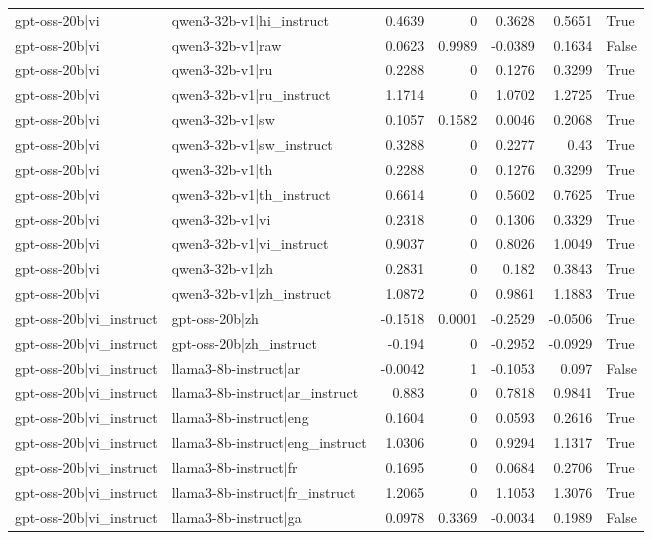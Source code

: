 \begin{table}
\begin{tabular}{l l r r r r l}
gpt-oss-20b|vi & qwen3-32b-v1|hi_instruct & 0.4639 & 0 & 0.3628 & 0.5651 & True \\
gpt-oss-20b|vi & qwen3-32b-v1|raw & 0.0623 & 0.9989 & -0.0389 & 0.1634 & False \\
gpt-oss-20b|vi & qwen3-32b-v1|ru & 0.2288 & 0 & 0.1276 & 0.3299 & True \\
gpt-oss-20b|vi & qwen3-32b-v1|ru_instruct & 1.1714 & 0 & 1.0702 & 1.2725 & True \\
gpt-oss-20b|vi & qwen3-32b-v1|sw & 0.1057 & 0.1582 & 0.0046 & 0.2068 & True \\
gpt-oss-20b|vi & qwen3-32b-v1|sw_instruct & 0.3288 & 0 & 0.2277 & 0.43 & True \\
gpt-oss-20b|vi & qwen3-32b-v1|th & 0.2288 & 0 & 0.1276 & 0.3299 & True \\
gpt-oss-20b|vi & qwen3-32b-v1|th_instruct & 0.6614 & 0 & 0.5602 & 0.7625 & True \\
gpt-oss-20b|vi & qwen3-32b-v1|vi & 0.2318 & 0 & 0.1306 & 0.3329 & True \\
gpt-oss-20b|vi & qwen3-32b-v1|vi_instruct & 0.9037 & 0 & 0.8026 & 1.0049 & True \\
gpt-oss-20b|vi & qwen3-32b-v1|zh & 0.2831 & 0 & 0.182 & 0.3843 & True \\
gpt-oss-20b|vi & qwen3-32b-v1|zh_instruct & 1.0872 & 0 & 0.9861 & 1.1883 & True \\
gpt-oss-20b|vi_instruct & gpt-oss-20b|zh & -0.1518 & 0.0001 & -0.2529 & -0.0506 & True \\
gpt-oss-20b|vi_instruct & gpt-oss-20b|zh_instruct & -0.194 & 0 & -0.2952 & -0.0929 & True \\
gpt-oss-20b|vi_instruct & llama3-8b-instruct|ar & -0.0042 & 1 & -0.1053 & 0.097 & False \\
gpt-oss-20b|vi_instruct & llama3-8b-instruct|ar_instruct & 0.883 & 0 & 0.7818 & 0.9841 & True \\
gpt-oss-20b|vi_instruct & llama3-8b-instruct|eng & 0.1604 & 0 & 0.0593 & 0.2616 & True \\
gpt-oss-20b|vi_instruct & llama3-8b-instruct|eng_instruct & 1.0306 & 0 & 0.9294 & 1.1317 & True \\
gpt-oss-20b|vi_instruct & llama3-8b-instruct|fr & 0.1695 & 0 & 0.0684 & 0.2706 & True \\
gpt-oss-20b|vi_instruct & llama3-8b-instruct|fr_instruct & 1.2065 & 0 & 1.1053 & 1.3076 & True \\
gpt-oss-20b|vi_instruct & llama3-8b-instruct|ga & 0.0978 & 0.3369 & -0.0034 & 0.1989 & False \\

\end{tabular}
\end{table}
